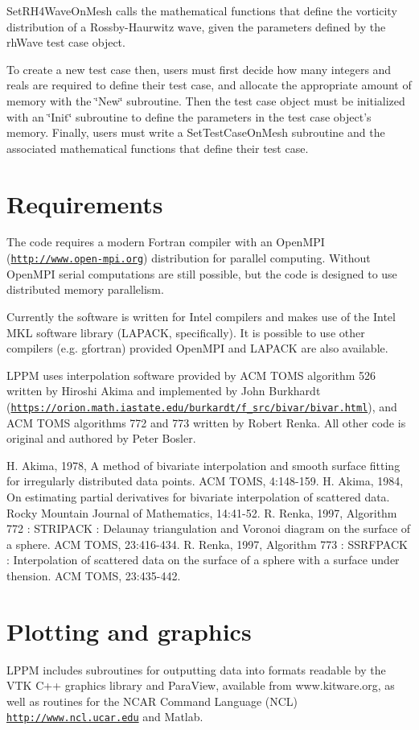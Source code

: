 Set\+R\+H4\+Wave\+On\+Mesh calls the mathematical functions that define the vorticity distribution of a Rossby-\/\+Haurwitz wave, given the parameters defined by the rh\+Wave test case object.

To create a new test case then, users must first decide how many integers and reals are required to define their test case, and allocate the appropriate amount of memory with the \char`\"{}\+New\char`\"{} subroutine. Then the test case object must be initialized with an \char`\"{}\+Init\char`\"{} subroutine to define the parameters in the test case object's memory. Finally, users must write a Set\+Test\+Case\+On\+Mesh subroutine and the associated mathematical functions that define their test case.

\section*{Requirements }

The code requires a modern Fortran compiler with an Open\+M\+P\+I (\href{http://www.open-mpi.org}{\tt http\+://www.\+open-\/mpi.\+org}) distribution for parallel computing. Without Open\+M\+P\+I serial computations are still possible, but the code is designed to use distributed memory parallelism.

Currently the software is written for Intel compilers and makes use of the Intel M\+K\+L software library (L\+A\+P\+A\+C\+K, specifically). It is possible to use other compilers (e.\+g. gfortran) provided Open\+M\+P\+I and L\+A\+P\+A\+C\+K are also available.

L\+P\+P\+M uses interpolation software provided by A\+C\+M T\+O\+M\+S algorithm 526 written by Hiroshi Akima and implemented by John Burkhardt (\href{https://orion.math.iastate.edu/burkardt/f_src/bivar/bivar.html}{\tt https\+://orion.\+math.\+iastate.\+edu/burkardt/f\+\_\+src/bivar/bivar.\+html}), and A\+C\+M T\+O\+M\+S algorithms 772 and 773 written by Robert Renka. All other code is original and authored by Peter Bosler. \begin{DoxyVerb}H. Akima, 1978, A method of bivariate interpolation and smooth surface fitting for irregularly distributed data points.
    ACM TOMS, 4:148-159.
H. Akima, 1984, On estimating partial derivatives for bivariate interpolation of scattered data.
    Rocky Mountain Journal of Mathematics, 14:41-52.
R. Renka, 1997, Algorithm 772 : STRIPACK : Delaunay triangulation and Voronoi diagram on the surface of a sphere.
    ACM TOMS, 23:416-434.
R. Renka, 1997, Algorithm 773 : SSRFPACK : Interpolation of scattered data on the surface of a sphere with a surface under thension.
    ACM TOMS, 23:435-442.
\end{DoxyVerb}


\section*{Plotting and graphics }

L\+P\+P\+M includes subroutines for outputting data into formats readable by the V\+T\+K C++ graphics library and Para\+View, available from www.\+kitware.\+org, as well as routines for the N\+C\+A\+R Command Language (N\+C\+L) \href{http://www.ncl.ucar.edu}{\tt http\+://www.\+ncl.\+ucar.\+edu} and Matlab. 
